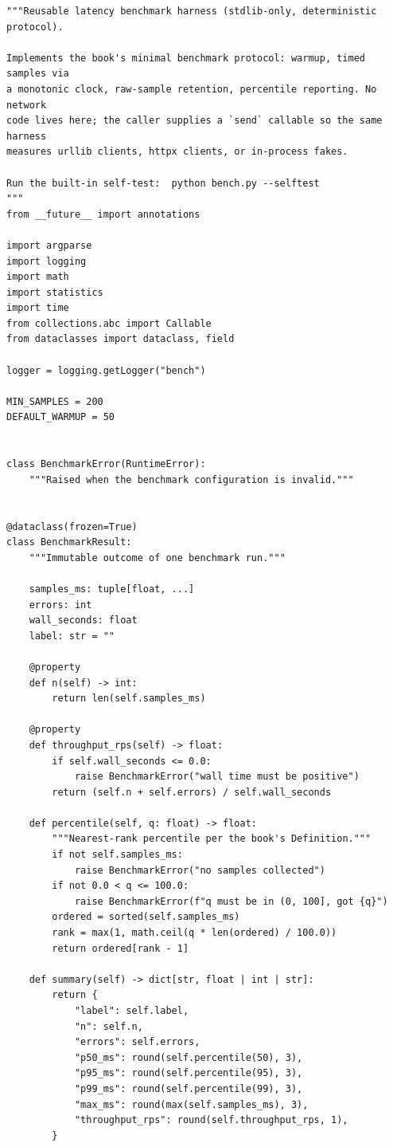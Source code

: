 \begin{verbatim}
"""Reusable latency benchmark harness (stdlib-only, deterministic protocol).

Implements the book's minimal benchmark protocol: warmup, timed samples via
a monotonic clock, raw-sample retention, percentile reporting. No network
code lives here; the caller supplies a `send` callable so the same harness
measures urllib clients, httpx clients, or in-process fakes.

Run the built-in self-test:  python bench.py --selftest
"""
from __future__ import annotations

import argparse
import logging
import math
import statistics
import time
from collections.abc import Callable
from dataclasses import dataclass, field

logger = logging.getLogger("bench")

MIN_SAMPLES = 200
DEFAULT_WARMUP = 50


class BenchmarkError(RuntimeError):
    """Raised when the benchmark configuration is invalid."""


@dataclass(frozen=True)
class BenchmarkResult:
    """Immutable outcome of one benchmark run."""

    samples_ms: tuple[float, ...]
    errors: int
    wall_seconds: float
    label: str = ""

    @property
    def n(self) -> int:
        return len(self.samples_ms)

    @property
    def throughput_rps(self) -> float:
        if self.wall_seconds <= 0.0:
            raise BenchmarkError("wall time must be positive")
        return (self.n + self.errors) / self.wall_seconds

    def percentile(self, q: float) -> float:
        """Nearest-rank percentile per the book's Definition."""
        if not self.samples_ms:
            raise BenchmarkError("no samples collected")
        if not 0.0 < q <= 100.0:
            raise BenchmarkError(f"q must be in (0, 100], got {q}")
        ordered = sorted(self.samples_ms)
        rank = max(1, math.ceil(q * len(ordered) / 100.0))
        return ordered[rank - 1]

    def summary(self) -> dict[str, float | int | str]:
        return {
            "label": self.label,
            "n": self.n,
            "errors": self.errors,
            "p50_ms": round(self.percentile(50), 3),
            "p95_ms": round(self.percentile(95), 3),
            "p99_ms": round(self.percentile(99), 3),
            "max_ms": round(max(self.samples_ms), 3),
            "throughput_rps": round(self.throughput_rps, 1),
        }



\end{verbatim}
